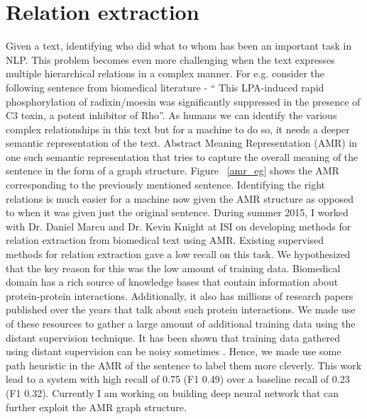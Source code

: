 \documentclass[11pt,a4paper]{article}
\begin{document}
\section{Relation extraction}
Given a text, identifying who did what to whom has been an important task in NLP. This problem becomes even more challenging when the text expresses multiple hierarchical relations in a complex manner. For e.g. consider the following sentence from biomedical literature - `` This LPA-induced rapid phosphorylation of radixin/moesin was significantly suppressed in the presence of C3 toxin, a potent inhibitor of Rho''. As humans we can identify the various complex relationships in this text but for a machine to do so, it needs a deeper semantic representation of the text. Abstract Meaning Representation (AMR) \cite{banarescu2013abstract} in one such semantic representation that tries to capture the overall meaning of the sentence in the form of a graph structure. Figure ~\ref{amr_eg} shows the AMR corresponding to the previously mentioned sentence. Identifying the right relations is much easier for a machine now given the AMR structure as opposed to when it was given just the original sentence. During summer 2015, I worked with Dr. Daniel Marcu and Dr. Kevin Knight at ISI on developing methods for relation extraction from biomedical text using AMR. Existing supervised methods for relation extraction gave a low recall on this task. We hypothesized that the key reason for this was the low amount of training data. Biomedical domain has a rich source of knowledge bases that contain information about protein-protein interactions. Additionally, it also has millions of research papers published over the years that talk about such protein interactions. We made use of these resources to gather a large amount of additional training data using the distant supervision technique. It has been shown that training data gathered using distant supervision can be noisy sometimes \cite{takamatsu2012reducing}. Hence, we made use some path heuristic in the AMR of the sentence to label them more cleverly. This work lead to a system with high recall of 0.75 (F1 0.49) over a baseline recall of 0.23 (F1 0.32). Currently I am working on building deep neural network that can further exploit the AMR graph structure.
\end{document}
